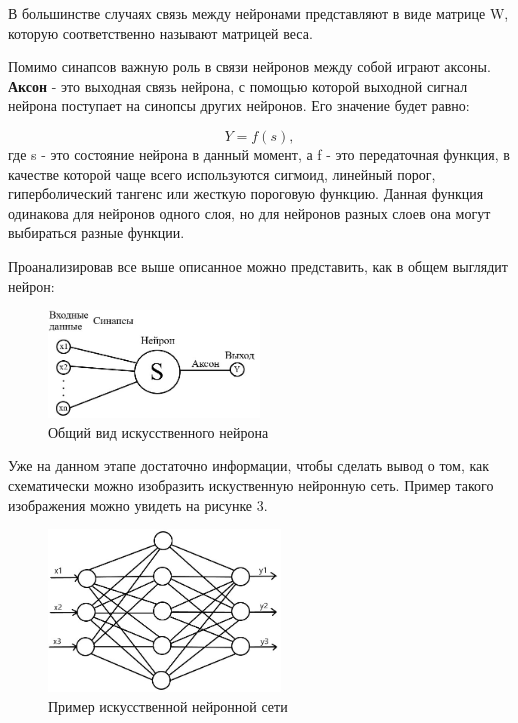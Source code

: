\documentclass[bachelor, och, coursework]{shiza}
\begin{document}
В большинстве случаях связь между нейронами представляют в виде матрице W, которую соответственно называют матрицей веса.

Помимо синапсов важную роль в связи нейронов между собой играют аксоны. \textbf{Аксон} - это выходная связь нейрона, с помощью которой выходной 
сигнал нейрона поступает на синопсы других нейронов. Его значение будет равно:

\begin{equation}
    Y = f(s),
\end{equation}
где s - это состояние нейрона в данный момент, а f - это передаточная функция, в качестве которой чаще всего используются сигмоид, линейный порог,
гиперболический тангенс или жесткую пороговую функцию. Данная функция одинакова для нейронов одного слоя, но для нейронов разных слоев она могут
выбираться разные функции.

Проанализировав все выше описанное можно представить, как в общем выглядит нейрон:

\begin{figure}[H]
    \centering
    \includegraphics[width=0.5\textwidth]{pic/3}
    \caption{Общий вид искусственного нейрона}
    \label{fig:img1}
\end{figure}

Уже на данном этапе достаточно информации, чтобы сделать вывод о том, как схематически можно изобразить искуственную нейронную сеть. Пример такого
изображения можно увидеть на рисунке 3.

\begin{figure}[H]
    \centering
    \includegraphics[width=0.55\textwidth]{pic/4}
    \caption{Пример искусственной нейронной сети}
    \label{fig:img1}
\end{figure}
\end{document}
